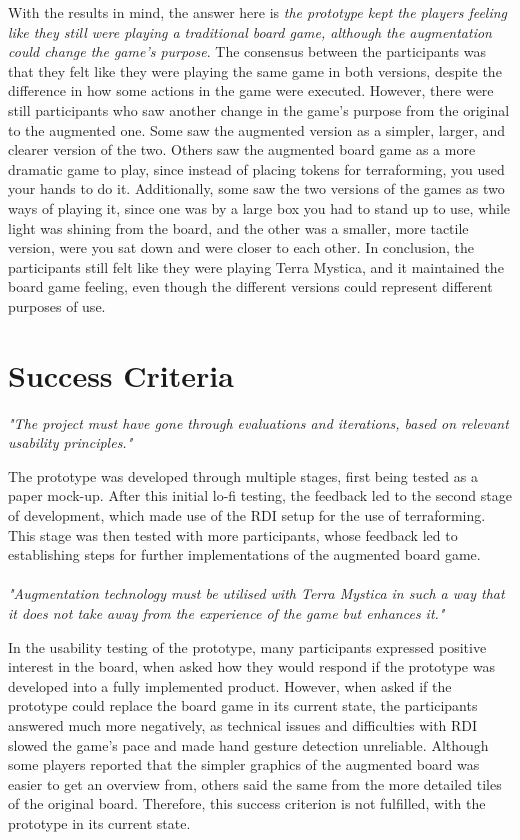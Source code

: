 With the results in mind, the answer here is \textit{the prototype kept the players feeling like they still were playing a traditional board game, although the augmentation could change the game’s purpose}. The consensus between the participants was that they felt like they were playing the same game in both versions, despite the difference in how some actions in the game were executed. However, there were still participants who saw another change in the game’s purpose from the original to the augmented one. Some saw the augmented version as a simpler, larger, and clearer version of the two. Others saw the augmented board game as a more dramatic game to play, since instead of placing tokens for terraforming, you used your hands to do it. Additionally, some saw the two versions of the games as two ways of playing it, since one was by a large box you had to stand up to use, while light was shining from the board, and the other was a smaller, more tactile version, were you sat down and were closer to each other. In conclusion, the participants still felt like they were playing Terra Mystica, and it maintained the board game feeling, even though the different versions could represent different purposes of use.

\section{Success Criteria}
\textit{"The project must have gone through evaluations and iterations, based on relevant usability principles."}

The prototype was developed through multiple stages, first being tested as a paper mock-up. After this initial lo-fi testing, the feedback led to the second stage of development, which made use of the RDI setup for the use of terraforming. This stage was then tested with more participants, whose feedback led to establishing steps for further implementations of the augmented board game.\\
\\

\textit{"Augmentation technology must be utilised with Terra Mystica in such a way that it does not take away from the experience of the game but enhances it."}

In the usability testing of the prototype, many participants expressed positive interest in the board, when asked how they would respond if the prototype was developed into a fully implemented product. However, when asked if the prototype could replace the board game in its current state, the participants answered much more negatively, as technical issues and difficulties with RDI slowed the game’s pace and made hand gesture detection unreliable. Although some players reported that the simpler graphics of the augmented board was easier to get an overview from, others said the same from the more detailed tiles of the original board. Therefore, this success criterion is not fulfilled, with the prototype in its current state.\\
\\

